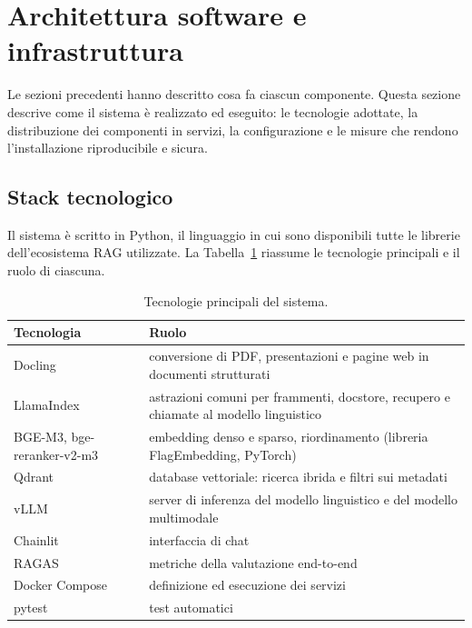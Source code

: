 \section{Architettura software e infrastruttura}\label{sec:infrastruttura}

Le sezioni precedenti hanno descritto cosa fa ciascun componente. Questa sezione descrive come il sistema è
realizzato ed eseguito: le tecnologie adottate, la distribuzione dei componenti in servizi, la configurazione e le
misure che rendono l'installazione riproducibile e sicura.

\subsection{Stack tecnologico}

Il sistema è scritto in Python, il linguaggio in cui sono disponibili tutte le librerie dell'ecosistema RAG
utilizzate. La Tabella~\ref{tab:stack} riassume le tecnologie principali e il ruolo di ciascuna.

\begin{table}[H]
  \centering
  \small
  \begin{tabularx}{\textwidth}{>{\raggedright\arraybackslash}p{3.4cm} X}
    \toprule
    \textbf{Tecnologia} & \textbf{Ruolo} \\
    \midrule
    Docling \cite{docling2024} & conversione di PDF, presentazioni e pagine web in documenti strutturati \\
    LlamaIndex & astrazioni comuni per frammenti, docstore, recupero e chiamate al modello linguistico \\
    BGE-M3, bge-reranker-v2-m3 & embedding denso e sparso, riordinamento (libreria FlagEmbedding, PyTorch) \\
    Qdrant & database vettoriale: ricerca ibrida e filtri sui metadati \\
    vLLM \cite{kwon2023vllm} & server di inferenza del modello linguistico e del modello multimodale \\
    Chainlit & interfaccia di chat \\
    RAGAS \cite{es2023ragas} & metriche della valutazione end-to-end \\
    Docker Compose & definizione ed esecuzione dei servizi \\
    pytest & test automatici \\
    \bottomrule
  \end{tabularx}
  \caption{Tecnologie principali del sistema.}
  \label{tab:stack}
\end{table}

